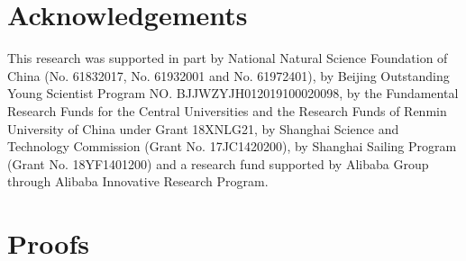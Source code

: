\documentclass{article}
\begin{document}
\section*{Acknowledgements}
This research was supported in part by National Natural Science Foundation of China (No. 61832017, No. 61932001 and No. 61972401), by Beijing Outstanding Young Scientist Program NO. BJJWZYJH012019100020098, by the Fundamental Research Funds for the Central Universities and the Research Funds of Renmin University of China under Grant 18XNLG21, by Shanghai Science and Technology Commission (Grant No. 17JC1420200), 
by Shanghai Sailing Program (Grant No. 18YF1401200) and a research fund supported by Alibaba Group through Alibaba Innovative Research Program.







\clearpage
\appendix
\section{Proofs}
\end{document}
